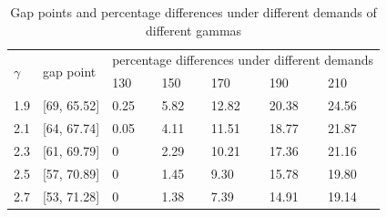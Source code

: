 \begin{table}[ht]
  \centering
  \caption{Gap points and percentage differences under different demands of different gammas}
\begin{tabular}{lllllll}
  \hline
  \multicolumn{1}{|l|}{\multirow{2}{*}{$\gamma$}} & \multicolumn{1}{l|}{\multirow{2}{*}{gap point}} & \multicolumn{5}{l|}{percentage differences under different demands}   \\ 
  \cline{3-7} 
  \multicolumn{1}{|l|}{}                      & \multicolumn{1}{l|}{}                    & \multicolumn{1}{l|}{130} & \multicolumn{1}{l|}{150} & \multicolumn{1}{l|}{170} & \multicolumn{1}{l|}{190} & \multicolumn{1}{l|}{210} \\ 
  \hline
  \multicolumn{1}{|l|}{1.9}  & \multicolumn{1}{l|}{[69, 65.52]}  & \multicolumn{1}{l|}{0.25}  & \multicolumn{1}{l|}{5.82}  & \multicolumn{1}{l|}{12.82} & \multicolumn{1}{l|}{20.38} & \multicolumn{1}{l|}{24.56} \\ 
  \hline                                    
  \multicolumn{1}{|l|}{2.1}  & \multicolumn{1}{l|}{[64, 67.74]}  & \multicolumn{1}{l|}{0.05}  & \multicolumn{1}{l|}{4.11}  & \multicolumn{1}{l|}{11.51} & \multicolumn{1}{l|}{18.77} & \multicolumn{1}{l|}{21.87} \\ 
  \hline           
  \multicolumn{1}{|l|}{2.3}  & \multicolumn{1}{l|}{[61, 69.79]}  & \multicolumn{1}{l|}{0}  & \multicolumn{1}{l|}{2.29}  & \multicolumn{1}{l|}{10.21} & \multicolumn{1}{l|}{17.36} & \multicolumn{1}{l|}{21.16} \\ 
  \hline           
  \multicolumn{1}{|l|}{2.5}  & \multicolumn{1}{l|}{[57, 70.89]}  & \multicolumn{1}{l|}{0}  & \multicolumn{1}{l|}{1.45}  & \multicolumn{1}{l|}{9.30} & \multicolumn{1}{l|}{15.78} & \multicolumn{1}{l|}{19.80} \\ 
  \hline          
  \multicolumn{1}{|l|}{2.7}  & \multicolumn{1}{l|}{[53, 71.28]}  & \multicolumn{1}{l|}{0}  & \multicolumn{1}{l|}{1.38}  & \multicolumn{1}{l|}{7.39} & \multicolumn{1}{l|}{14.91} & \multicolumn{1}{l|}{19.14} \\ 
  \hline            
\end{tabular}
\end{table}




